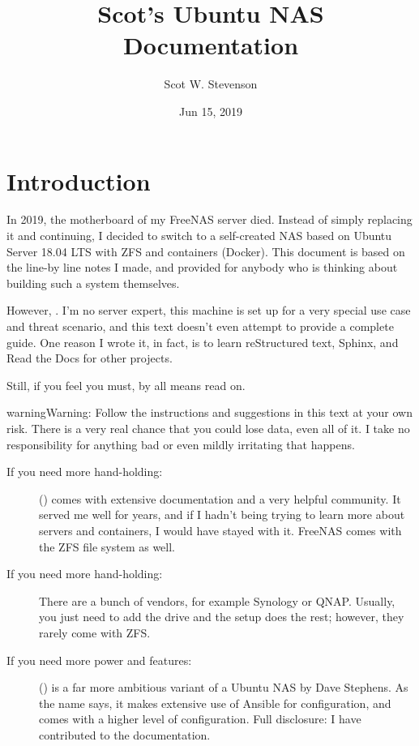 \documentclass[a4paper,10pt,english]{sphinxmanual}
\title{Scot's Ubuntu NAS Documentation}
\date{Jun 15, 2019}
\author{Scot W. Stevenson}
\begin{document}
\pagestyle{empty}
\sphinxmaketitle
\pagestyle{plain}
\sphinxtableofcontents
\pagestyle{normal}
\label{\detokenize{index::doc}}



\chapter{Introduction}
\label{\detokenize{introduction:introduction}}\label{\detokenize{introduction::doc}}
In 2019, the motherboard of my FreeNAS server died. Instead of simply replacing
it and continuing, I decided to switch to a self-created NAS based on Ubuntu
Server 18.04 LTS with ZFS and containers (Docker). This document is based on the
line-by line notes I made, and provided for anybody who is thinking about
building such a system themselves.

However, . I’m no server expert, this
machine is set up for a very special use case and threat scenario, and this text
doesn’t even attempt to provide a complete guide. One reason I wrote it, in
fact, is to learn reStructured text, Sphinx, and Read the Docs for other
projects.

Still, if you feel you must, by all means read on.

\begin{sphinxadmonition}{warning}{Warning:}
Follow the instructions and suggestions in this text at your own
risk. There is a very real chance that you could lose data, even all of
it. I take no responsibility for anything bad or even mildly irritating
that happens.
\end{sphinxadmonition}
\begin{description}
\item[{If you need more hand-holding:}] \leavevmode
{} () comes with extensive documentation and a
very helpful community. It served me well for years, and if I hadn’t
being trying to learn more about servers and containers, I would have stayed
with it. FreeNAS comes with the ZFS file system as well.

\item[{If you need  more hand-holding:}] \leavevmode
There are a bunch of  vendors, for example Synology or
QNAP. Usually, you just need to add the drive and the setup does the
rest; however, they rarely come with ZFS.

\item[{If you need more power and features:}] \leavevmode
{} () is a far more
ambitious variant of a Ubuntu NAS by Dave Stephens. As the name says, it
makes extensive use of Ansible for configuration, and comes with
a higher level of configuration. Full disclosure: I have contributed to the
documentation.

\end{description}
\end{document}
